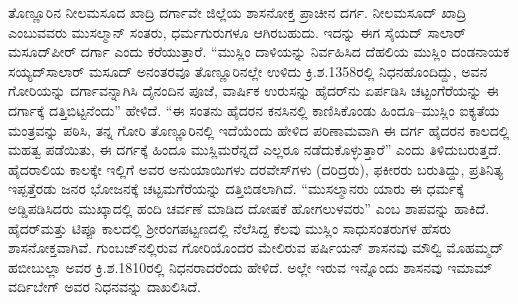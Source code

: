 ತೊಣ್ಣೂರಿನ ನೀಲಮಸೂದ ಖಾದ್ರಿ ದರ್ಗಾವೇ ಜಿಲ್ಲೆಯ ಶಾಸನೋಕ್ತ ಪ್ರಾಚೀನ ದರ್ಗ. ನೀಲಮಸೂದ್​ ಖಾದ್ರಿ ಎಂಬುವವರು ಮುಸಲ್ಮಾನ್​ ಸಂತರು, ಧರ್ಮಗುರುಗಳೂ ಆಗಿರಬಹುದು. ಇದನ್ನು ಈಗ ಸೈಯದ್​ ಸಾಲಾರ್​ ಮಸೂದ್​ ಪೀರ್​ ದರ್ಗಾ ಎಂದು ಕರೆಯುತ್ತಾರೆ. “ಮುಸ್ಲಿಂ ದಾಳಿಯನ್ನು ನಿರ್ವಹಿಸಿದ ದೆಹಲಿಯ ಮುಸ್ಲಿಂ ದಂಡನಾಯಕ ಸಯ್ಯದ್​ ಸಾಲಾರ್​ ಮಸೂದ್​ ಅನಂತರವೂ ತೊಣ್ಣೂರಿನಲ್ಲೇ ಉಳಿದು ಕ್ರಿ.ಶ.1358ರಲ್ಲಿ ನಿಧನಹೊಂದಿದ್ದು, ಅವನ ಗೋರಿಯನ್ನು ದರ್ಗಾವನ್ನಾಗಿಸಿ ದೈನಂದಿನ ಪೂಜೆ, ವಾರ್ಷಿಕ ಉರುಸನ್ನು ಹೈದರ್​ನು ಏರ್ಪಡಿಸಿ ಚಟ್ಟಂಗೆರೆಯನ್ನು ಈ ದರ್ಗಾಕ್ಕೆ ದತ್ತಿಬಿಟ್ಟನೆಂದು” ಹೇಳಿದೆ. “ಈ ಸಂತನು ಹೈದರನ ಕನಸಿನಲ್ಲಿ ಕಾಣಿಸಿಕೊಂಡು ಹಿಂದೂ–ಮುಸ್ಲಿಂ ಐಕ್ಯತೆಯ ಮಂತ್ರವನ್ನು ಪಠಿಸಿ, ತನ್ನ ಗೋರಿ ತೊಣ್ಣೂರಿನಲ್ಲಿ ಇದೆಯೆಂದು ಹೇಳಿದ ಪರಿಣಾಮವಾಗಿ ಈ ದರ್ಗ ಹೈದರನ ಕಾಲದಲ್ಲಿ ಮಹತ್ವ ಪಡೆಯಿತು, ಈ ದರ್ಗಕ್ಕೆ ಹಿಂದೂ ಮುಸ್ಲಿಮರೆನ್ನದೆ ಎಲ್ಲರೂ ನಡೆದುಕೊಳ್ಳುತ್ತಾರೆ” ಎಂದು ತಿಳಿದುಬರುತ್ತದೆ. ಹೈದರಾಲಿಯ ಕಾಲಕ್ಕೇ ಇಲ್ಲಿಗೆ ಅವರ ಅನುಯಾಯಿಗಳು ದರವೇಸ್​ಗಳು (ದರಿದ್ರರು), ಫಕೀರರು ಬರುತಿದ್ದು, ಪ್ರತಿನಿತ್ಯ ಇಪ್ಪತ್ತೆರಡು ಜನರ ಭೋಜನಕ್ಕೆ ಚಟ್ಟಮಗೆರೆಯನ್ನು ದತ್ತಿಬಿಡಲಾಗಿದೆ. “ಮುಸಲ್ಮಾನರು ಯಾರು ಈ ಧರ್ಮಕ್ಕೆ ಅಡ್ಡಿಪಡಿಸಿದರು ಮುಖ್ಕಾದಲ್ಲಿ ಹಂದಿ ಚರ್ವಣೆ ಮಾಡಿದ ದೋಷಕೆ ಹೋಗಲುಳವರು” ಎಂಬ ಶಾಪವನ್ನು ಹಾಕಿದೆ. ಹೈದರ್​ ಮತ್ತು ಟಿಪ್ಪೂ ಕಾಲದಲ್ಲಿ ಶ‍್ರೀರಂಗಪಟ್ಟಣದಲ್ಲಿ ನೆಲೆಸಿದ್ದ ಕೆಲವು ಮುಸ್ಲಿಂ ಸಾಧುಸಂತರುಗಳ ಹೆಸರು ಶಾಸನೋಕ್ತವಾಗಿವೆ. ಗುಂಬಜ್​ನಲ್ಲಿರುವ ಗೋರಿಯೊಂದರ ಮೇಲಿರುವ ಪರ್ಷಿಯನ್​ ಶಾಸನವು ಮೌಲ್ವಿ ಮೊಹಮ್ಮದ್​ ಹಬೀಬುಲ್ಲಾ ಅವರ ಕ್ರಿ.ಶ.1810ರಲ್ಲಿ ನಿಧನರಾದರೆಂದು ಹೇಳಿದೆ. ಅಲ್ಲೇ ಇರುವ ಇನ್ನೊಂದು ಶಾಸನವು ಇಮಾಮ್ ವರ್ದಿಬೇಗ್​ ಅವರ ನಿಧನವನ್ನು ದಾಖಲಿಸಿದೆ.

